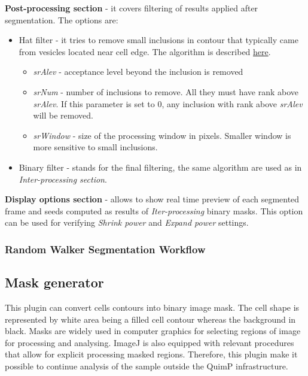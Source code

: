 \documentclass[a4paper,12pt]{article}
\begin{document}
\textbf{Post-processing section} - it covers filtering of results applied after segmentation. The options are:
\begin{itemize}
	\item Hat filter - it tries to remove small inclusions in contour that typically came from vesicles located near cell edge. The algorithm is described \href{http://pilip.lnx.warwick.ac.uk/site/apidocs/index.html}{here}.
	\begin{itemize}
		\item \textit{srAlev} - acceptance level beyond the inclusion is removed
		\item \textit{srNum} - number of inclusions to remove. All they must have rank above \textit{srAlev}. If this parameter is set to 0, any inclusion with rank above \textit{srAlev} will be removed. 
		\item \textit{srWindow} - size of the processing window in pixels. Smaller window is more sensitive to small inclusions. 
	\end{itemize} 
	\item Binary filter - stands for the final filtering, the same algorithm are used as in \textit{Inter-processing section}.
\end{itemize}

\textbf{Display options section} - allows to show real time preview of each segmented frame and seeds computed as results of \textit{Iter-processing} binary masks. This option can be used for verifying \textit{Shrink power} and \textit{Expand power} settings. 

\subsubsection{Random Walker Segmentation Workflow}

\subsection{Mask generator}
\label{sec:MaskGenerator}
This plugin can convert cells contours into binary image mask. The cell shape is represented by white area being a filled cell contour whereas the background in black. Masks are widely used in computer graphics for selecting regions of image for processing and analysing. ImageJ is also equipped with relevant procedures that allow for explicit processing masked regions. Therefore, this plugin make it possible to continue analysis of the sample outside the QuimP infrastructure.
\end{document}
